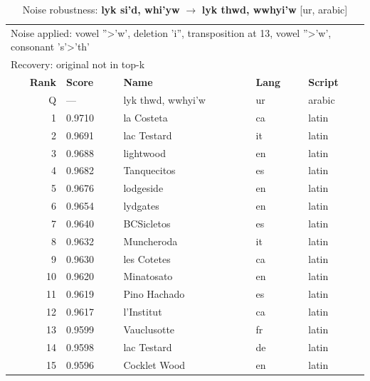 \begin{table}[htbp]
\centering
\small
\caption{Noise robustness: \textbf{lyk si'd, whi'yw} $\rightarrow$ \textbf{lyk thwd, wwhyi'w} [ur, arabic]}
\label{tab:noise-37}
\begin{tabular}{rllll}
\toprule
\multicolumn{5}{l}{\small Noise applied: vowel ''>'w', deletion 'i'', transposition at 13, vowel ''>'w', consonant 's'>'th'} \\
\multicolumn{5}{l}{\small Recovery: original not in top-k} \\
\midrule
\textbf{Rank} & \textbf{Score} & \textbf{Name} & \textbf{Lang} & \textbf{Script} \\
\midrule
\rowcolor{gray!20} Q & --- & lyk thwd, wwhyi'w & ur & arabic \\
\midrule
1 & 0.9710 & la Costeta & ca & latin \\
2 & 0.9691 & lac Testard & it & latin \\
3 & 0.9688 & lightwood & en & latin \\
4 & 0.9682 & Tanquecitos & es & latin \\
5 & 0.9676 & lodgeside & en & latin \\
6 & 0.9654 & lydgates & en & latin \\
7 & 0.9640 & BCSicletos & es & latin \\
8 & 0.9632 & Muncheroda & it & latin \\
9 & 0.9630 & les Cotetes & ca & latin \\
10 & 0.9620 & Minatosato & en & latin \\
11 & 0.9619 & Pino Hachado & es & latin \\
12 & 0.9617 & l'Institut & ca & latin \\
13 & 0.9599 & Vauclusotte & fr & latin \\
14 & 0.9598 & lac Testard & de & latin \\
15 & 0.9596 & Cocklet Wood & en & latin \\
\bottomrule
\end{tabular}
\end{table}

